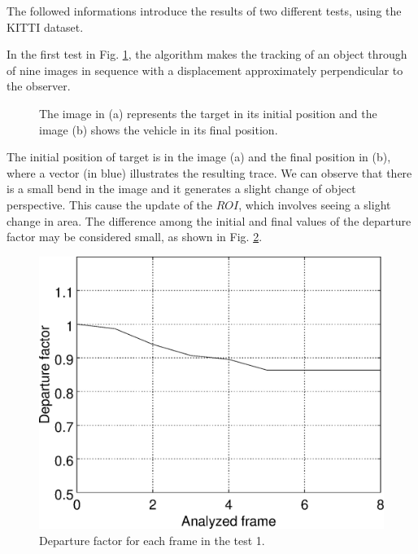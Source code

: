 The followed informations introduce the results of two different tests, 
using the KITTI dataset\cite{Geiger}.


In the first test in Fig. \ref{fig:imgpapercerta}, 
the algorithm makes the tracking of an object through of nine images in sequence with 
a displacement approximately perpendicular to the observer.
\begin{figure}[!hbt]
\centering
  \caption{The image in (a) represents the target in its initial position 
   and the image (b) shows the vehicle in its final position.}
  \label{fig:imgpapercerta}
\end{figure}
The initial position of target is in the image (a) and the final position in (b), 
where a vector (in blue) illustrates the resulting trace.
We can observe that there is a small bend in the image 
and it generates a slight change of object perspective. 
This cause the update of the $ROI$, which involves seeing a slight change in area.
The difference among the initial and final values of the departure factor may 
be considered small, as shown in Fig. \ref{fig:res_graph1}.
\begin{figure}[!hbt]
\centering
\includegraphics[width=0.8\columnwidth]{images/graph1.eps}
\caption{Departure factor for each frame in the test 1.}
\label{fig:res_graph1}
\end{figure}
